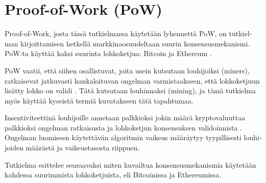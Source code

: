 \section{Proof-of-Work (PoW)\label{pow}}
\begin{otherlanguage}{english}
Proof-of-Work, josta tässä tutkielmassa käytetään lyhennettä PoW, on tutkielman kirjoittamisen hetkellä markkinaosuudeltaan suurin konsensusmekanismi. PoW:ta käyttää kaksi suurinta lohkoketjua: Bitcoin ja Ethereum \cite{Coingecko}.

PoW vaatii, että siihen osallistuvat, joita usein kutsutaan louhijoiksi (miners), ratkaisevat jatkuvasti hankaloituvan ongelman varmistaakseen, että lohkoketjuun lisätty lohko on validi \cite{blockchain1}. Tätä kutsutaan louhinnaksi (mining), ja tämä tutkielma myös käyttää kyseistä termiä kuvatakseen tätä tapahtumaa.

Insentiviteettinä louhijoille annetaan palkkioksi jokin määrä kryptovaluuttaa palkkioksi ongelman ratkaisusta ja lohkoketjun konsensuksen validoinnista \cite{blockchain1}. Ongelman luomiseen käytettävän algoritmin vaikeus määräytyy tyypillisesti louhijoiden määrästä ja vaikeustasosta riippuen.

Tutkielma esittelee seuraavaksi miten kuvailtua konsensusmekanismia käytetään kahdessa suurimmista lohkoketjuista, eli Bitcoinissa ja Ethereumissa.




\end{otherlanguage}